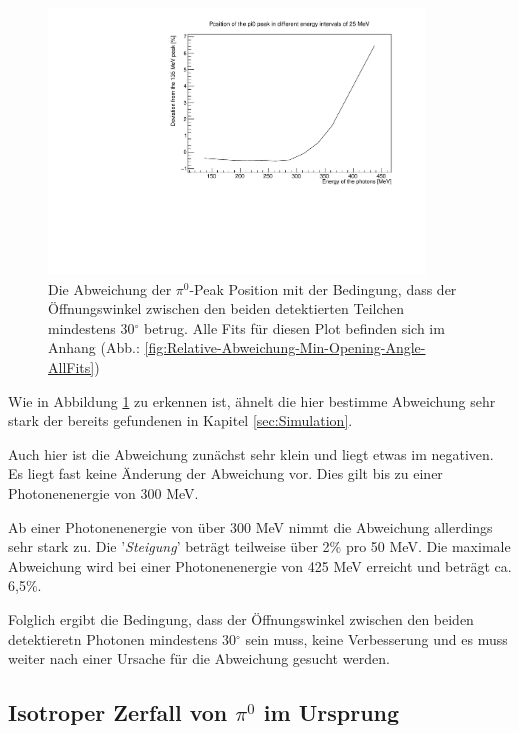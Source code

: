 \documentclass[a4paper,11pt,oneside,final,german,openbib,pdftex]{scrbook}
\begin{document}
{\begin{figure}[h!]
	\begin{center}
		\includegraphics[width=100mm]{NewCalib/20171904SimMinOpeningAngleDeviation}
		\caption[Simulation: Symmetrische Photonen; Mindestwinkel zwischen detektierten Photonen]{Die Abweichung der $\pi^0$-Peak Position mit der Bedingung, dass der \"Offnungswinkel zwischen den beiden detektierten Teilchen mindestens 30$^{\circ}$ betrug. Alle Fits f\"ur diesen Plot befinden sich im Anhang (Abb.: \ref{fig:Relative-Abweichung-Min-Opening-Angle-AllFits})}
		\label{fig:Relative-Abweichung-Min-Opening-Angle}
	\end{center}
\end{figure}

Wie in Abbildung \ref{fig:Relative-Abweichung-Min-Opening-Angle} zu erkennen ist, \"ahnelt die hier bestimme Abweichung sehr stark der bereits gefundenen in Kapitel \ref{sec:Simulation}.

Auch hier ist die Abweichung zun\"achst sehr klein und liegt etwas im negativen. Es liegt fast keine \"Anderung der Abweichung vor. Dies gilt bis zu einer Photonenenergie von 300 MeV.

Ab einer Photonenenergie von \"uber 300 MeV nimmt die Abweichung allerdings sehr stark zu. Die '\textit{Steigung}' betr\"agt teilweise \"uber 2\% pro 50 MeV. Die maximale Abweichung wird bei einer Photonenenergie von 425 MeV erreicht und betr\"agt ca. 6,5\%.

Folglich ergibt die Bedingung, dass der \"Offnungswinkel zwischen den beiden detektieretn Photonen mindestens 30$^{\circ}$ sein muss, keine Verbesserung und es muss weiter nach einer Ursache f\"ur die Abweichung gesucht werden.




\subsection{Isotroper Zerfall von $\pi^0$ im Ursprung}
\label{sec:Isotroper-Zerfall-Ursprung}

}
\end{document}
